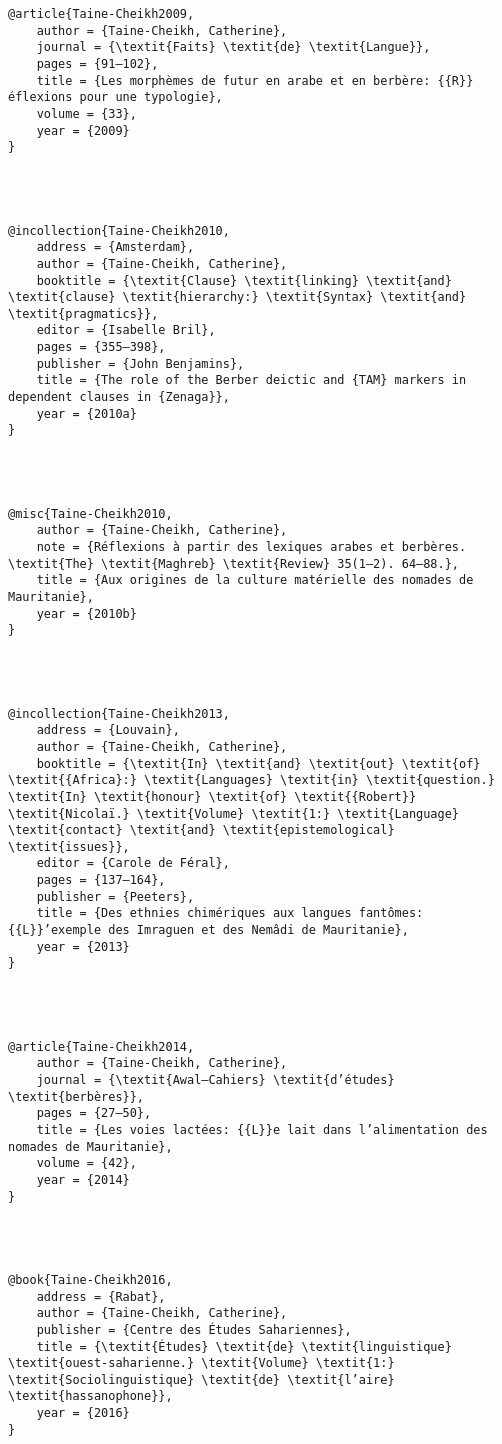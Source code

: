 \documentclass[output=paper]{langsci/langscibook}
\begin{document}
\begin{verbatim}
@article{Taine-Cheikh2009,
	author = {Taine-Cheikh, Catherine},
	journal = {\textit{Faits} \textit{de} \textit{Langue}},
	pages = {91–102},
	title = {Les morphèmes de futur en arabe et en berbère: {{R}}éflexions pour une typologie},
	volume = {33},
	year = {2009}
}




@incollection{Taine-Cheikh2010,
	address = {Amsterdam},
	author = {Taine-Cheikh, Catherine},
	booktitle = {\textit{Clause} \textit{linking} \textit{and} \textit{clause} \textit{hierarchy:} \textit{Syntax} \textit{and} \textit{pragmatics}},
	editor = {Isabelle Bril},
	pages = {355–398},
	publisher = {John Benjamins},
	title = {The role of the Berber deictic and {TAM} markers in dependent clauses in {Zenaga}},
	year = {2010a}
}




@misc{Taine-Cheikh2010,
	author = {Taine-Cheikh, Catherine},
	note = {Réflexions à partir des lexiques arabes et berbères. \textit{The} \textit{Maghreb} \textit{Review} 35(1–2). 64–88.},
	title = {Aux origines de la culture matérielle des nomades de Mauritanie},
	year = {2010b}
}




@incollection{Taine-Cheikh2013,
	address = {Louvain},
	author = {Taine-Cheikh, Catherine},
	booktitle = {\textit{In} \textit{and} \textit{out} \textit{of} \textit{{Africa}:} \textit{Languages} \textit{in} \textit{question.} \textit{In} \textit{honour} \textit{of} \textit{{Robert}} \textit{Nicolaï.} \textit{Volume} \textit{1:} \textit{Language} \textit{contact} \textit{and} \textit{epistemological} \textit{issues}},
	editor = {Carole de Féral},
	pages = {137–164},
	publisher = {Peeters},
	title = {Des ethnies chimériques aux langues fantômes: {{L}}’exemple des Imraguen et des Nemâdi de Mauritanie},
	year = {2013}
}




@article{Taine-Cheikh2014,
	author = {Taine-Cheikh, Catherine},
	journal = {\textit{Awal–Cahiers} \textit{d’études} \textit{berbères}},
	pages = {27–50},
	title = {Les voies lactées: {{L}}e lait dans l’alimentation des nomades de Mauritanie},
	volume = {42},
	year = {2014}
}




@book{Taine-Cheikh2016,
	address = {Rabat},
	author = {Taine-Cheikh, Catherine},
	publisher = {Centre des Études Sahariennes},
	title = {\textit{Études} \textit{de} \textit{linguistique} \textit{ouest-saharienne.} \textit{Volume} \textit{1:} \textit{Sociolinguistique} \textit{de} \textit{l’aire} \textit{hassanophone}},
	year = {2016}
}





\end{verbatim}
\end{document}
